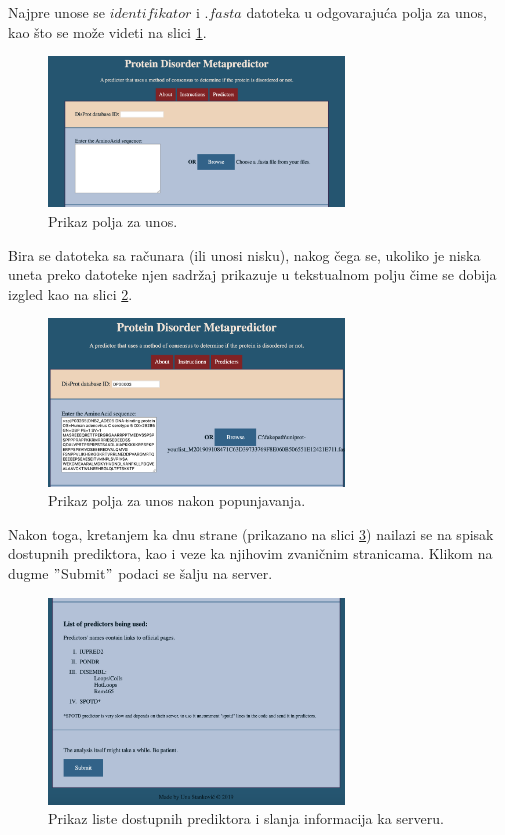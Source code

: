 Najpre unose se $identifikator$ i $.fasta$ datoteka u odgovarajuća polja za unos, kao što se može videti na slici \ref{fig:poljaunos}.
\begin{figure}[H]
	\centering
    \includegraphics[width=0.7\textwidth]{Figures/App/first_screen.png}
    \caption{Prikaz polja za unos.}
    \label{fig:poljaunos}
\end{figure}
Bira se datoteka sa računara (ili unosi nisku), nakog čega se, ukoliko je niska uneta preko datoteke njen sadržaj prikazuje u tekstualnom polju čime se dobija izgled kao na slici \ref{fig:unos}.
\begin{figure}[H]
	\centering
    \includegraphics[width=0.7\textwidth]{Figures/App/second_screen.png}
    \caption{Prikaz polja za unos nakon popunjavanja.}
    \label{fig:unos}
\end{figure}
Nakon toga, kretanjem ka dnu strane (prikazano na slici \ref{fig:browse}) nailazi se na spisak dostupnih prediktora, kao i veze ka njihovim zvaničnim stranicama. Klikom na dugme $"$Submit$"$ podaci se šalju na server.
\begin{figure}[H]
	\centering
    \includegraphics[width=0.7\textwidth]{Figures/App/third_screen.png}
    \caption{Prikaz liste dostupnih prediktora i slanja informacija ka serveru.}
    \label{fig:browse}
\end{figure}
